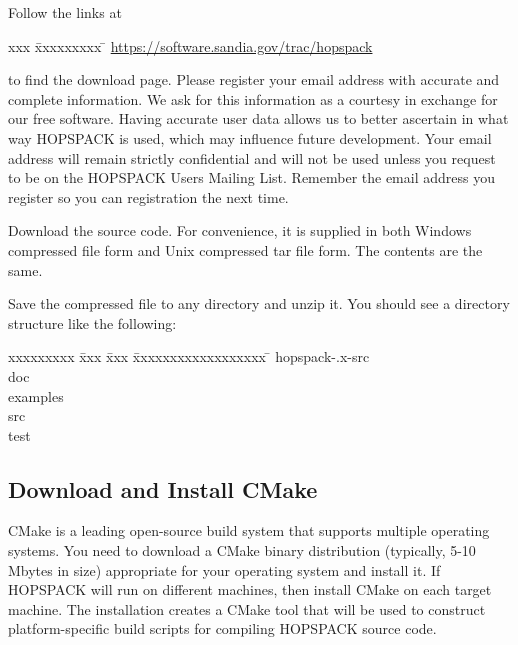 Follow the links at
\vspace{-11pt}
\begin{tabbing}
  xxx \= xxxxxxxxx \= \kill
  \> \href{https://software.sandia.gov/trac/hopspack}
          {https://software.sandia.gov/trac/hopspack}
\end{tabbing}
\vspace{-11pt}
to find the download page.  Please register your email address with
accurate and complete information.  We ask for this information as a
courtesy in exchange for our free software.  Having accurate user data allows
us to better ascertain in what way HOPSPACK is used, which may influence
future development.  Your email address will remain strictly confidential
and will not be used unless you request to be on the HOPSPACK Users Mailing List.
Remember the email address you register so you can registration the next time.

Download the source code.  For convenience, it is supplied in both Windows
compressed file form and Unix compressed tar file form.  The contents are
the same.

Save the compressed file to any directory and unzip it.
You should see a directory structure like the following:
\vspace{-11pt}
\begin{tabbing}
  xxxxxxxxx \= xxx \= xxx \= xxxxxxxxxxxxxxxxxx \= \kill
  \> {\sf hopspack-\HOPSVER.x-src}  \\
  \> \> {\sf doc}                   \\
  \> \> {\sf examples}              \\
  \> \> {\sf src}                   \\
  \> \> {\sf test}
\end{tabbing}


\subsection{Download and Install CMake}
\label{subinstall:CM}

CMake is a leading open-source build system that supports multiple operating
systems.  You need to download a CMake binary distribution
(typically, 5-10 Mbytes in size) appropriate for your operating system
and install it.  If HOPSPACK will run on different machines, then install
CMake on each target machine.
The installation creates a CMake tool that will be used to construct
platform-specific build scripts for compiling HOPSPACK source code.

